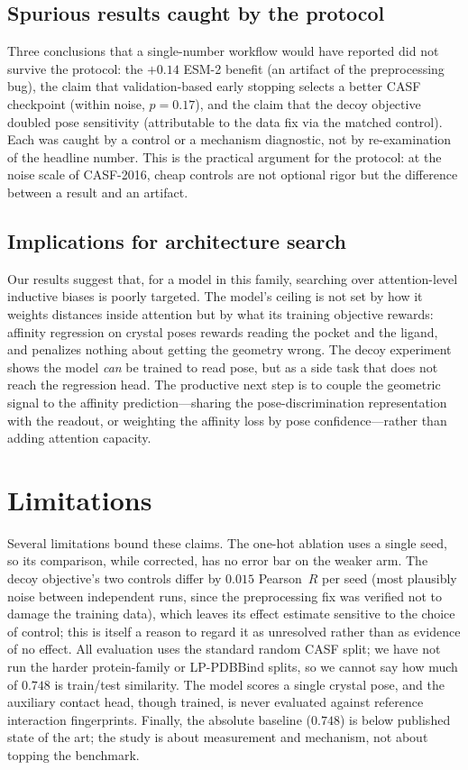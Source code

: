\documentclass[11pt]{article}
\newcommand{\pearson}{Pearson~$R$}
\begin{document}
\subsection{Spurious results caught by the protocol}

Three conclusions that a single-number workflow would have reported did not survive the
protocol: the $+0.14$ ESM-2 benefit (an artifact of the preprocessing bug), the claim that
validation-based early stopping selects a better CASF checkpoint (within noise, $p=0.17$),
and the claim that the decoy objective doubled pose sensitivity (attributable to the data
fix via the matched control). Each was caught by a control or a mechanism diagnostic, not
by re-examination of the headline number. This is the practical argument for the protocol:
at the noise scale of CASF-2016, cheap controls are not optional rigor but the difference
between a result and an artifact.

\subsection{Implications for architecture search}

Our results suggest that, for a model in this family, searching over attention-level
inductive biases is poorly targeted. The model's ceiling is not set by how it weights
distances inside attention but by what its training objective rewards: affinity regression
on crystal poses rewards reading the pocket and the ligand, and penalizes nothing about
getting the geometry wrong. The decoy experiment shows the model \emph{can} be trained to
read pose, but as a side task that does not reach the regression head. The productive next
step is to couple the geometric signal to the affinity prediction---sharing the
pose-discrimination representation with the readout, or weighting the affinity loss by pose
confidence---rather than adding attention capacity.

\section{Limitations}

Several limitations bound these claims. The one-hot ablation uses a single seed, so its
comparison, while corrected, has no error bar on the weaker arm. The decoy objective's two
controls differ by $0.015$ \pearson{} per seed (most plausibly noise between independent
runs, since the preprocessing fix was verified not to damage the training data), which
leaves its effect estimate sensitive to the choice of control; this is itself a reason to
regard it as unresolved rather than as evidence of no effect. All evaluation uses the
standard random CASF split; we have not run the harder protein-family or LP-PDBBind splits,
so we cannot say how much of $0.748$ is train/test similarity. The model scores a single
crystal pose, and the auxiliary contact head, though trained, is never evaluated against
reference interaction fingerprints. Finally, the absolute baseline ($0.748$) is below
published state of the art; the study is about measurement and mechanism, not about topping
the benchmark.
\end{document}
